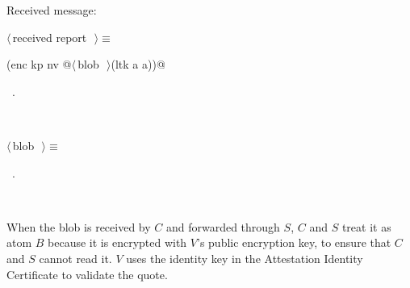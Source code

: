 \documentclass[titlepage,12pt]{article}
\theoremstyle{definition}
\begin{document}
\begin{description}
Received message:
\begin{flushleft} \small
\begin{minipage}{\linewidth} \label{scrap9}
$\langle\,$received report\nobreak\ {\footnotesize {}}$\,\rangle\equiv$
\vspace{-1ex}
\begin{list}{}{} \item
\mbox{}\verb@(enc kp nv @\hbox{$\langle\,$blob\nobreak\ {\footnotesize {}}$\,\rangle$}\verb@ (ltk a a))@{\NWsep}
\end{list}
\vspace{-1ex}
\footnotesize\addtolength{\baselineskip}{-1ex}
\begin{list}{}{\setlength{\itemsep}{-\parsep}\setlength{\itemindent}{-\leftmargin}}
\item \NWtxtMacroRefIn\ .
\end{list}
\end{minipage}\\[4ex]
\end{flushleft}
\begin{flushleft} \small
\begin{minipage}{\linewidth} \label{scrap10}
$\langle\,$blob\nobreak\ {\footnotesize {}}$\,\rangle\equiv$
\vspace{-1ex}
\begin{list}{}{} \item
\mbox{}\verb@b@{\NWsep}
\end{list}
\vspace{-1ex}
\footnotesize\addtolength{\baselineskip}{-1ex}
\begin{list}{}{\setlength{\itemsep}{-\parsep}\setlength{\itemindent}{-\leftmargin}}
\item \NWtxtMacroRefIn\ .
\end{list}
\end{minipage}\\[4ex]
\end{flushleft}
\item[$C\to S:B$]
\item[$S\to V:B\colon$]
When the blob is received by $C$ and forwarded through $S$,
$C$ and $S$ treat it as atom $B$ because it is encrypted with $V$'s
public encryption key, to ensure that $C$ and $S$ cannot read it.  $V$
uses the identity key in the Attestation Identity Certificate to
validate the quote.
\item[$V\to S:\vtosb\colon$]

\end{description}
\end{document}
